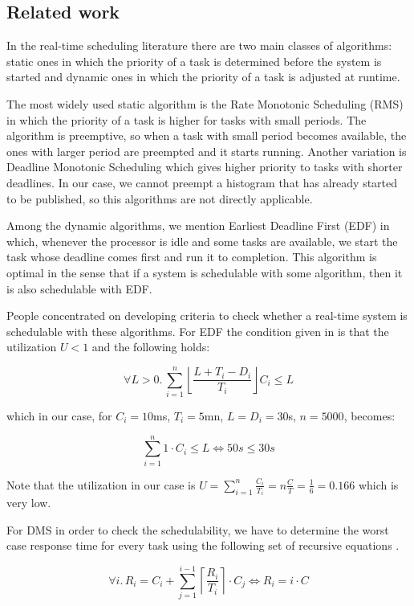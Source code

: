 \subsection*{Related work}

In the real-time scheduling literature there are two main classes of algorithms: static ones in which the priority of a task is determined before the system is started and dynamic ones in which the priority of a task is adjusted at runtime. 

The most widely used static algorithm is the Rate Monotonic Scheduling (RMS) \citep{liu1973scheduling} in which the priority of a task is higher for tasks with small periods. The algorithm is preemptive, so when a task with small period becomes available, the ones with larger period are preempted and it starts running. Another variation is Deadline Monotonic Scheduling which gives higher priority to tasks with shorter deadlines. In our case, we cannot preempt a histogram that has already started to be published, so this algorithms are not directly applicable. 

Among the dynamic algorithms, we mention Earliest Deadline First (EDF) \citep{liu1973scheduling} in which, whenever the processor is idle and some tasks are available, we start the task whose deadline comes first and run it to completion. This algorithm is optimal in the sense that if a system is schedulable with some algorithm, then it is also schedulable with EDF.

People concentrated on developing criteria to check whether a real-time system is schedulable with these algorithms. For EDF the condition given in \citep{baruah1990algorithms} is that the utilization $U < 1$ and the following holds:

$$ \forall L > 0.\,  \sum_{i=1}^n \left\lfloor \frac{L+T_i-D_i}{T_i}\right\rfloor C_i \le L $$

which in our case, for $C_i=10$ms, $T_i=5$mn, $L=D_i=30$s, $n=5000$, becomes:

$$ \sum_{i=1}^n 1 \cdot C_i \le L \Leftrightarrow 50s \le 30s $$

Note that the utilization in our case is $U=\sum_{i=1}^n\frac{C_i}{T_i}=n\frac C T = \frac 1 6 = 0.166$ which is very low. 

For DMS in order to check the schedulability, we have to determine the worst case response time for every task using the following set of recursive equations \citep{joseph1986finding}.

 $$ \forall i.\, R_i=C_i+\sum_{j=1}^{i-1} \left\lceil \frac{R_i}{T_i} \right\rceil \cdot C_j \Leftrightarrow R_i = i\cdot C$$
 

